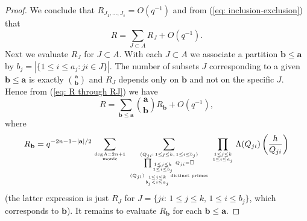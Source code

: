 \documentclass[10pt,a4paper]{amsart}
\begin{document}
\begin{proof}
We conclude that $R_{J_1,\ldots,J_s}=O(q^{-1})$ and from (\ref{eq: inclusion-exclusion}) that
\begin{equation}\label{eq: R through RJ}R=\sum_{J\subset A}R_J+O(q^{-1}).\end{equation}
Next we evaluate $R_J$ for $J\subset A$.
With each $J\subset A$ we associate a partition $\mathbf b\le\mathbf a$ by $b_j=|\{1\le i\le a_j: ji\in J\}|$.
The number of subsets $J$ corresponding to a given $\mathbf b\le\mathbf a$ is exactly $\mathbf a\choose\mathbf b$ and $R_J$ depends only on $\mathbf b$ and not on the specific $J$. Hence from (\ref{eq: R through RJ}) we have
\begin{equation}\label{eq: R through Rb}R=\sum_{\mathbf b\le\mathbf a}{\mathbf a\choose\mathbf b}R_{\mathbf b}+O(q^{-1}),\end{equation}
where
$$R_{\mathbf b}=q^{-2n-1-|\mathbf a|/2}
\sum_{\deg h=2n+1\atop{\mathrm{monic}}}
\sum_
{(Q_{ji}:\,1\le j\le k,\,1\le i\le b_j)\atop{\prod_{1\le j\le k\atop{1\le i\le b_j}}Q_{ji}=\square\atop{(Q_{ji})_{1\le j\le k\atop{b_j<i\le a_j}}\text{distinct primes}}}}
\prod_{1\le j\le k\atop{1\le i\le a_j}}\Lambda(Q_{ji})\left(\frac{h}{Q_{ji}}\right)
$$
(the latter expression is just $R_J$ for $J=\{ji:\,1\le j\le k,\,1\le i\le b_j\}$, which corresponds to $\mathbf b$).
It remains to evaluate $R_{\mathbf b}$ for each $\mathbf b\le\mathbf a$.


\end{proof}
\end{document}
